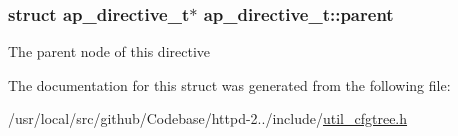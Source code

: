 \subsubsection[{\texorpdfstring{parent}{parent}}]{\setlength{\rightskip}{0pt plus 5cm}struct {\bf ap\+\_\+directive\+\_\+t}$\ast$ ap\+\_\+directive\+\_\+t\+::parent}\hypertarget{structap__directive__t_a2269b52ef32da6ee5116fb559df38fc7}{}\label{structap__directive__t_a2269b52ef32da6ee5116fb559df38fc7}
The parent node of this directive 

The documentation for this struct was generated from the following file\+:\begin{DoxyCompactItemize}
\item 
/usr/local/src/github/\+Codebase/httpd-\/2../include/\hyperlink{util__cfgtree_8h}{util\+\_\+cfgtree.\+h}\end{DoxyCompactItemize}
